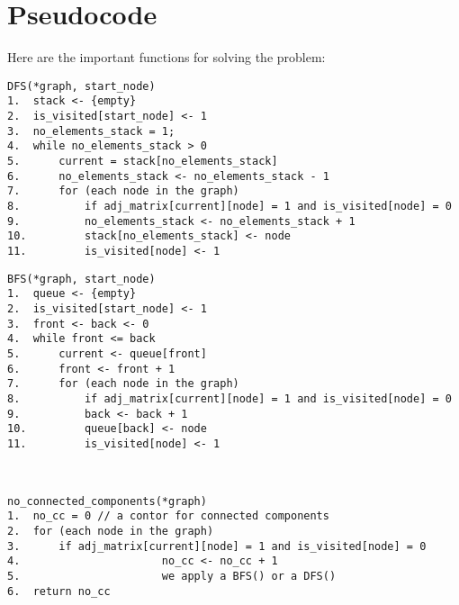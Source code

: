\documentclass[14pt]{article}
\begin{document}
\newpage
\section*{Pseudocode}

\indent Here are the important functions for solving the problem:
\begin{lstlisting}
DFS(*graph, start_node)
1.	stack <- {empty}
2.	is_visited[start_node] <- 1
3.	no_elements_stack = 1;
4.	while no_elements_stack > 0
5.      current = stack[no_elements_stack]
6.      no_elements_stack <- no_elements_stack - 1
7.      for (each node in the graph)
8.	        if adj_matrix[current][node] = 1 and is_visited[node] = 0
9.			no_elements_stack <- no_elements_stack + 1
10.			stack[no_elements_stack] <- node
11.			is_visited[node] <- 1

\end{lstlisting}
\begin{lstlisting}
BFS(*graph, start_node)
1.	queue <- {empty}
2.	is_visited[start_node] <- 1
3.	front <- back <- 0
4.	while front <= back
5.		current <- queue[front]
6.		front <- front + 1  
7.		for (each node in the graph)
8.	        if adj_matrix[current][node] = 1 and is_visited[node] = 0
9.			back <- back + 1 
10.			queue[back] <- node
11.			is_visited[node] <- 1


\end{lstlisting}
\begin{lstlisting}

no_connected_components(*graph)
1.	no_cc = 0 // a contor for connected components
2.	for (each node in the graph)
3.		if adj_matrix[current][node] = 1 and is_visited[node] = 0
4.                      no_cc <- no_cc + 1   
5.                      we apply a BFS() or a DFS()
6.  return no_cc

\end{lstlisting}

\newpage
\end{document}
